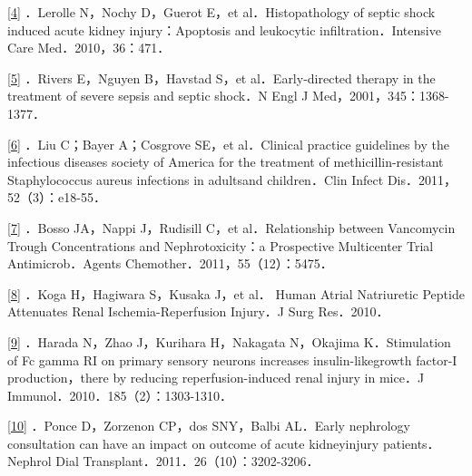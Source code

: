\protect\hyperlink{text00017.htmlux5cux23ch4-16-back}{{[}4{]}} ．Lerolle
N，Nochy D，Guerot E，et al．Histopathology of septic shock induced
acute kidney injury：Apoptosis and leukocytic infiltration．Intensive
Care Med．2010，36：471．

\protect\hyperlink{text00017.htmlux5cux23ch5-16-back}{{[}5{]}} ．Rivers
E，Nguyen B，Havstad S，et al．Early-directed therapy in the treatment
of severe sepsis and septic shock．N Engl J Med，2001，345：1368-1377．

\protect\hyperlink{text00017.htmlux5cux23ch6-16-back}{{[}6{]}} ．Liu
C；Bayer A；Cosgrove SE，et al．Clinical practice guidelines by the
infectious diseases society of America for the treatment of
methicillin-resistant Staphylococcus aureus infections in adultsand
children．Clin Infect Dis．2011，52（3）：e18-55．

\protect\hyperlink{text00017.htmlux5cux23ch7-16-back}{{[}7{]}} ．Bosso
JA，Nappi J，Rudisill C，et al．Relationship between Vancomycin Trough
Concentrations and Nephrotoxicity：a Prospective Multicenter Trial
Antimicrob．Agents Chemother．2011，55（12）：5475．

\protect\hyperlink{text00017.htmlux5cux23ch8-16-back}{{[}8{]}} ．Koga
H，Hagiwara S，Kusaka J，et al． Human Atrial Natriuretic Peptide
Attenuates Renal Ischemia-Reperfusion Injury．J Surg Res．2010．

\protect\hyperlink{text00017.htmlux5cux23ch9-16-back}{{[}9{]}} ．Harada
N，Zhao J，Kurihara H，Nakagata N，Okajima K．Stimulation of Fc gamma RI
on primary sensory neurons increases insulin-likegrowth factor-I
production，there by reducing reperfusion-induced renal injury in
mice．J Immunol．2010．185（2）：1303-1310．

\protect\hyperlink{text00017.htmlux5cux23ch10-16-back}{{[}10{]}} ．Ponce
D，Zorzenon CP，dos SNY，Balbi AL．Early nephrology consultation can
have an impact on outcome of acute kidneyinjury patients．Nephrol Dial
Transplant．2011．26（10）：3202-3206．

\protect\hypertarget{text00018.html}{}{}

